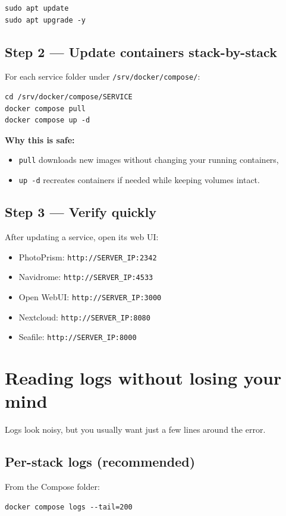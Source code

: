 \begin{lstlisting}
sudo apt update
sudo apt upgrade -y
\end{lstlisting}

\subsection{Step 2 --- Update containers stack-by-stack}
For each service folder under \texttt{/srv/docker/compose/}:

\begin{lstlisting}
cd /srv/docker/compose/SERVICE
docker compose pull
docker compose up -d
\end{lstlisting}

\textbf{Why this is safe:}
\begin{itemize}[leftmargin=*]
  \item \texttt{pull} downloads new images without changing your running containers,
  \item \texttt{up -d} recreates containers if needed while keeping volumes intact.
\end{itemize}

\subsection{Step 3 --- Verify quickly}
After updating a service, open its web UI:
\begin{itemize}[leftmargin=*]
  \item PhotoPrism: \texttt{http://SERVER\_IP:2342}
  \item Navidrome: \texttt{http://SERVER\_IP:4533}
  \item Open WebUI: \texttt{http://SERVER\_IP:3000}
  \item Nextcloud: \texttt{http://SERVER\_IP:8080}
  \item Seafile: \texttt{http://SERVER\_IP:8000}
\end{itemize}


\section{Reading logs without losing your mind}
Logs look noisy, but you usually want just a few lines around the error.

\subsection{Per-stack logs (recommended)}
From the Compose folder:
\begin{lstlisting}
docker compose logs --tail=200
\end{lstlisting}

